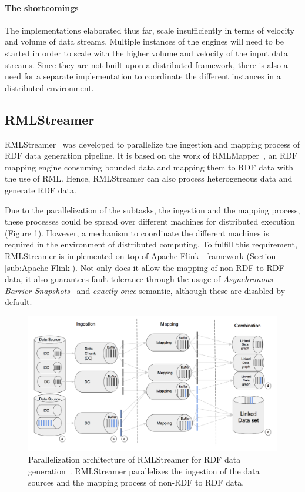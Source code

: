 \paragraph{The shortcomings}%
The implementations elaborated thus far, scale insufficiently in terms of velocity and 
volume of data streams. Multiple instances of the engines will need to 
be started in order to scale with the higher volume and velocity of 
the input data streams. Since they are not built upon a distributed framework, 
there is also a need for a separate implementation to coordinate the different 
instances in a distributed environment. 

\subsection{RMLStreamer}
\label{sec:rml_streamer}
RMLStreamer~\cite{rml_streamer}
was developed to parallelize the ingestion and mapping process of RDF data generation pipeline. 
It is based on the work of RMLMapper~\cite{rml}, an RDF mapping engine consuming bounded data and 
mapping them to RDF data with the use of RML. Hence, RMLStreamer can also 
process heterogeneous data and generate RDF data. 

Due to the parallelization of the subtasks, the ingestion and the mapping process, these processes
could be spread over different machines for distributed execution (Figure \ref{fig:rml-parallel-arch}). 
However, a mechanism to coordinate the different machines is required in the environment of 
distributed computing.  
To fulfill this requirement, RMLStreamer is 
implemented on top of Apache Flink~\cite{flink} framework (Section \ref{sub:Apache Flink}). Not only does it allow the mapping 
of non-RDF to RDF data, it also guarantees fault-tolerance through the usage of 
\emph{Asynchronous Barrier Snapshots}~\cite{flink_fault_tolerance} and \emph{exactly-once} semantic,
although these are disabled by default. 

\begin{figure}[!htbp]
  \centering
  \includegraphics[width=\textwidth]{fig/rml_streamer_arch.png}
  \caption{Parallelization architecture of RMLStreamer for RDF data generation~\cite{rml_streamer}. RMLStreamer parallelizes 
  the ingestion of the data sources and the mapping process of non-RDF to RDF data. }
  \label{fig:rml-parallel-arch}
\end{figure}



